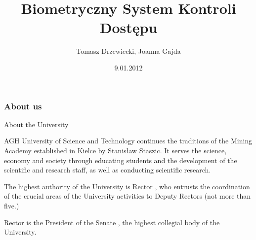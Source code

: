\documentclass{beamer}
\title[Biometryczny System Kontroli Dostępu]{Biometryczny System Kontroli Dostępu}
\author[T. Drzewiecki, J. Gajda]{Tomasz Drzewiecki, Joanna Gajda}
\date[2012]{9.01.2012}
\institute[AGH-EAIE]
{Wydział Elektrotechniki, Automatyki, Informatyki i Elektroniki\\ 
Katedra Automatyki
}
\begin{document}
{
 \begin{frame}
   \titlepage
 \end{frame}
}



\begin{frame}
\frametitle{About us}

\begin{block}{About the University}

AGH University of Science and Technology continues the traditions of the Mining Academy established in Kielce by Stanisław Staszic. It serves the science, economy and society through educating students and the development of the scientific and research staff, as well as conducting scientific research.

The highest authority of the University is Rector , who entrusts the coordination of the crucial areas of the University activities to Deputy Rectors (not more than five.)

Rector is the President of the Senate , the highest collegial body of the University. 
\end{block}
\end{frame}

\end{document}
